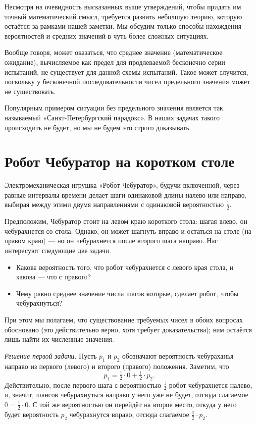 \documentclass{article}
\begin{document}
\medskip

Несмотря на очевидность высказанных выше утверждений,
чтобы придать им точный математический смысл,
требуется развить неболшую теорию, которую остаётся за рамками нашей заметки.
Мы обсудим только способы нахождения вероятностей и средних значений в чуть более сложных ситуациях.

Вообще говоря, может оказаться, что среднее значение (математическое ожидание), вычисляемое как предел для продлеваемой бесконечно серии испытаний, не существует для данной схемы испытаний. 
Такое может случится,
поскольку у бесконечной последовательности чисел предельного значения может не существовать.

Популярным примером ситуации без предельного значения является так называемый «Санкт-Петербургский парадокс». 
В наших задачах такого происходить не будет,
но мы не будем это строго доказывать.

\section{Робот Чебуратор на коротком столе} 

Электромеханическая игрушка «Робот Чебуратор», 
будучи включенной, через равные интервалы времени делает шаги одинаковой длины налево или направо,
выбирая между этими двумя направлениями с одинаковой вероятностью $\tfrac12$.

Предположим, Чебуратор стоит на левом краю короткого стола: шагая влево, он чебурахнется со стола.
Однако, он может шагнуть вправо и остаться на столе (на правом краю) --- но он чебурахнется после второго
шага направо. 
Нас интересуют следующие две задачи.
\begin{itemize}
\item Какова вероятность того, что робот чебурахнется с левого края стола, и какова --- что с правого?
\item Чему равно среднее значение числа шагов которые, сделает робот, чтобы чебурахнуться?
\end{itemize}
При этом мы полагаем, что существование требуемых чисел в обоих вопросах обосновано
(это действительно верно, хотя требует доказательства); нам остаётся лишь найти их численные значения.

\medskip
\noindent\textit{Решение первой задачи.}
Пусть $p_1$ и $p_2$ обозначают вероятность чебураханья направо из первого (левого) и второго (правого) положения.
Заметим, что
\[p_1=\tfrac12\cdot0+\tfrac12\cdot p_2.\]
Действительно, после первого шага с вероятностью $\tfrac12$ робот чебурахнется налево,
и, значит, шансов чебурахнуться направо у него уже не будет, 
отсюда слагаемое $0=\tfrac12\cdot0$. С той же вероятностью он перейдёт на второе место,
откуда у него будет вероятность $p_2$ чебурахнутся вправо, отсюда слагаемое $\tfrac12\cdot p_2$.
\end{document}
